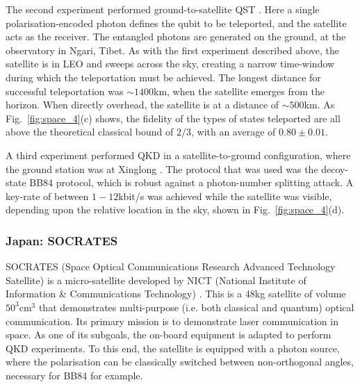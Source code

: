 The second experiment performed ground-to-satellite QST \cite{bib:ren2017ground}. Here a single polarisation-encoded photon defines the qubit to be teleported, and the satellite acts as the receiver. The entangled photons are generated on the ground, at the observatory in Ngari, Tibet. As with the first experiment described above, the satellite is in LEO and sweeps across the sky, creating a narrow time-window during which the teleportation must be achieved. The longest distance for successful teleportation was $\sim 1400$km, when the satellite emerges from the horizon. When directly overhead, the satellite is at a distance of $\sim 500$km. As Fig.~\ref{fig:space_4}(c) shows, the fidelity of the types of states teleported are all above the theoretical classical bound of $2/3$, with an average of $0.80 \pm 0.01$.  

A third experiment performed QKD in a satellite-to-ground configuration, where the ground station was at Xinglong \cite{bib:liao2017satellite}. The protocol that was used was the decoy-state BB84 protocol, which is robust against a photon-number splitting attack. A key-rate of between $1-12$kbit/s was achieved while the satellite was visible, depending upon the relative location in the sky, shown in Fig.~\ref{fig:space_4}(d).

%
%

\subsubsection{Japan: SOCRATES}

SOCRATES (Space Optical Communications Research Advanced Technology Satellite) is a micro-satellite developed by NICT (National Institute of Information \& Communications Technology) \cite{bib:horiuchi2015view, bib:toyoshima2015current, bib:takenaka2017}. This is a 48kg satellite of volume $50^3$cm$^3$ that demonstrates multi-purpose (i.e. both classical and quantum) optical communication. Its primary mission is to demonstrate laser communication in space. As one of its subgoals, the on-board equipment is adapted to perform QKD experiments. To this end, the satellite is equipped with a photon source, where the polarisation can be classically switched between non-orthogonal angles, necessary for BB84 for example.

